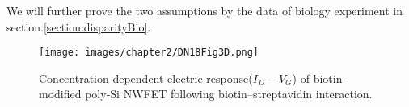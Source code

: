 We will further prove the two assumptions by the data of biology experiment in section.\ref{section:disparityBio}.

\begin{figure}[!htbp]
    \centering
    \texttt{[image: images/chapter2/DN18Fig3D.png]}
    \caption{Concentration-dependent electric response($I_D-V_G$) of biotin-modified poly-Si NWFET following biotin–streptavidin interaction.\cite{DN17}}
    \label{fig:DN17Fig6d}
\end{figure}










%
